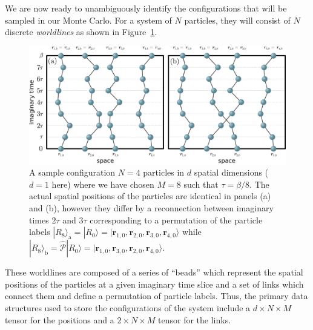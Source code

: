 \documentclass[prb,aps,amssym,nofootinbib,floatfix,notitlepage]{revtex4-1}
\renewcommand{\vec}[1]{\boldsymbol{#1}}
\begin{document}
We are now ready to unambiguously identify the configurations that will be
sampled in our Monte Carlo. For a system of $N$ particles, they will consist of
$N$ discrete \emph{worldlines} as shown in Figure~\ref{fig:config}. 
%
\begin{figure}
\begin{center}
\includegraphics[width=0.75\columnwidth]{Figures/worldlines.pdf}
\end{center}
\caption{A sample configuration $N=4$ particles in $d$ spatial dimensions ($d=1$
here) where we have chosen $M=8$ such that $\tau = \beta/8$. The actual
spatial positions of the particles are identical in panels (a) and (b),
however they differ by a reconnection between imaginary times $2\tau$ and $3\tau$
corresponding to a permutation of the particle labels $|R_8\rangle_\mathrm{a} =
|R_0\rangle = |\vec{r}_{1,0},\vec{r}_{2,0},\vec{r}_{3,0},\vec{r}_{4,0}\rangle$
while $|R_8\rangle_\mathrm{b} =
\hat{\mathcal{P}}|R_0\rangle =
|\vec{r}_{1,0},\vec{r}_{3,0},\vec{r}_{2,0},\vec{r}_{4,0}\rangle$.}
\label{fig:config}
 \end{figure}
%
These worldlines are composed of a series of ``beads'' which represent the
spatial positions of the particles at a given imaginary time slice and a set of
links which connect them and define a permutation of particle labels.  Thus,
the primary data structures used to store the configurations of the system
include a $d \times N \times M$ tensor for the positions and a $2 \times N
\times M$ tensor for the links.
\end{document}
